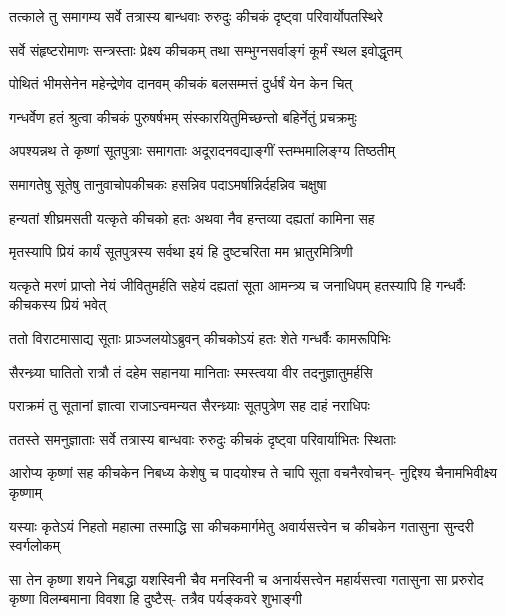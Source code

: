 \twolineshloka
{तत्काले तु समागम्य सर्वे तत्रास्य बान्धवाः}
{रुरुदुः कीचकं दृष्ट्वा परिवार्योपतस्थिरे}





\twolineshloka
{सर्वे संहृष्टरोमाणः सन्त्रस्ताः प्रेक्ष्य कीचकम्}
{तथा सम्भुग्नसर्वाङ्गं कूर्मं स्थल इवोद्धृतम्}


\twolineshloka
{पोथितं भीमसेनेन महेन्द्रेणेव दानवम्}
{कीचकं बलसम्मत्तं दुर्धर्षं येन केन चित्}


\twolineshloka
{गन्धर्वेण हतं श्रुत्वा कीचकं पुरुषर्षभम्}
{संस्कारयितुमिच्छन्तो बहिर्नेतुं प्रचक्रमुः}


\twolineshloka
{अपश्यन्नथ ते कृष्णां सूतपुत्राः समागताः}
{अदूरादनवद्याङ्गीं स्तम्भमालिङ्ग्य तिष्ठतीम्}


\twolineshloka
{समागतेषु सूतेषु तानुवाचोपकीचकः}
{हसन्निव पदाऽमर्षान्निर्दहन्निव चक्षुषा}


\twolineshloka
{हन्यतां शीघ्रमसती यत्कृते कीचको हतः}
{अथवा नैव हन्तव्या दह्यतां कामिना सह}


\twolineshloka
{मृतस्यापि प्रियं कार्यं सूतपुत्रस्य सर्वथा}
{इयं हि दुष्टचरिता मम भ्रातुरमित्रिणी}


\threelineshloka
{यत्कृते मरणं प्राप्तो नेयं जीवितुमर्हति}
{सहेयं दह्यतां सूता आमन्त्र्य च जनाधिपम्}
{हतस्यापि हि गन्धर्वैः कीचकस्य प्रियं भवेत्}


\twolineshloka
{ततो विराटमासाद्य सूताः प्राञ्जलयोऽब्रुवन्}
{कीचकोऽयं हतः शेते गन्धर्वैः कामरूपिभिः}


\twolineshloka
{सैरन्ध्र्या घातितो रात्रौ तं दहेम सहानया}
{मानिताः स्मस्त्वया वीर तदनुज्ञातुमर्हसि}


\twolineshloka
{पराक्रमं तु सूतानां ज्ञात्वा राजाऽन्वमन्यत}
{सैरन्ध्र्याः सूतपुत्रेण सह दाहं नराधिपः}


\twolineshloka
{ततस्ते समनुज्ञाताः सर्वे तत्रास्य बान्धवाः}
{रुरुदुः कीचकं दृष्ट्वा परिवार्याभितः स्थिताः}


\fourlineindentedshloka
{आरोप्य कृष्णां सह कीचकेन}
{निबध्य केशेषु च पादयोश्च}
{ते चापि सूता वचनैरवोचन्-}
{नुद्दिश्य चैनामभिवीक्ष्य कृष्णाम्}


\fourlineindentedshloka
{यस्याः कृतेऽयं निहतो महात्मा}
{तस्माद्धि सा कीचकमार्गमेतु}
{अवार्यसत्त्वेन च कीचकेन}
{गतासुना सुन्दरी स्वर्गलोकम्}


\sixlineindentedshloka
{सा तेन कृष्णा शयने निबद्धा}
{यशस्विनी चैव मनस्विनी च}
{अनार्यसत्त्वेन महार्यसत्त्वा}
{गतासुना सा प्ररुरोद कृष्णा}
{विलम्बमाना विवशा हि दुष्टैस्-}
{तत्रैव पर्यङ्कवरे शुभाङ्गी}


